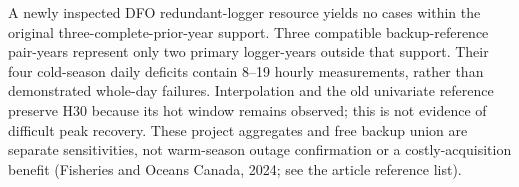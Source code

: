 A newly inspected DFO redundant-logger resource yields no cases within the original three-complete-prior-year support. Three compatible backup-reference pair-years represent only two primary logger-years outside that support. Their four cold-season daily deficits contain 8--19 hourly measurements, rather than demonstrated whole-day failures. Interpolation and the old univariate reference preserve H30 because its hot window remains observed; this is not evidence of difficult peak recovery. These project aggregates and free backup union are separate sensitivities, not warm-season outage confirmation or a costly-acquisition benefit (Fisheries and Oceans Canada, 2024; see the article reference list).

